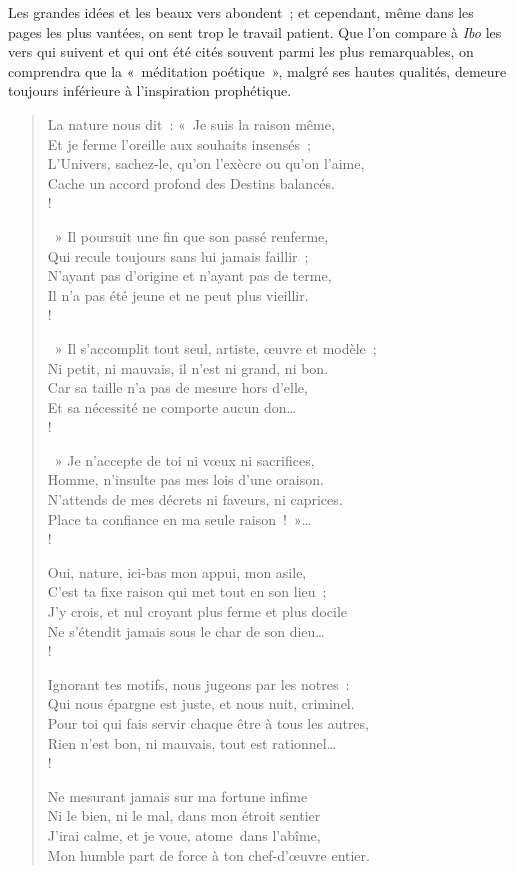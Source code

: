 \documentclass[french,twoside]{book} %
\begin{document}
Les grandes idées et les beaux vers abondent ; et cependant, même dans les pages les plus vantées, on sent trop le travail patient. Que l’on compare à \emph{Ibo} les vers qui suivent et qui ont été cités souvent parmi les plus remarquables, on comprendra que la « méditation poétique », malgré ses hautes qualités, demeure toujours inférieure à l’inspiration prophétique.\par


\begin{verse}
La nature nous dit : « Je suis la raison même,\\
Et je ferme l’oreille aux souhaits insensés ;\\
L’Univers, sachez-le, qu’on l’exècre ou qu’on l’aime,\\
Cache un accord profond des Destins balancés. \\!

 » Il poursuit une fin que son passé renferme,\\
Qui recule toujours sans lui jamais faillir ;\\
N’ayant pas d’origine et n’ayant pas de terme,\\
Il n’a pas été jeune et ne peut plus vieillir. \\!

 » Il s’accomplit tout seul, artiste, œuvre et modèle ;\\
Ni petit, ni mauvais, il n’est ni grand, ni bon.\\
Car sa taille n’a pas de mesure hors d’elle,\\
Et sa nécessité ne comporte aucun don… \\!

 » Je n’accepte de toi ni vœux ni sacrifices,\\
Homme, n’insulte pas mes lois d’une oraison.\\
N’attends de mes décrets ni faveurs, ni caprices.\\
Place ta confiance en ma seule raison ! »…\\!

Oui, nature, ici-bas mon appui, mon asile,\\
C’est ta fixe raison qui met tout en son lieu ;\\
J’y crois, et nul croyant plus ferme et plus docile\\
Ne s’étendit jamais sous le char de son dieu…\\!

Ignorant tes motifs, nous jugeons par les notres :\\
Qui nous épargne est juste, et nous nuit, criminel.\\
Pour toi qui fais servir chaque être à tous les autres,\\
Rien n’est bon, ni mauvais, tout est rationnel…\\!

Ne mesurant jamais sur ma fortune infime\\
Ni le bien, ni le mal, dans mon étroit sentier\\
J’irai calme, et je voue, atome dans l’abîme,\\
Mon humble part de force à ton chef-d’œuvre entier.\\
\end{verse}
\end{document}
